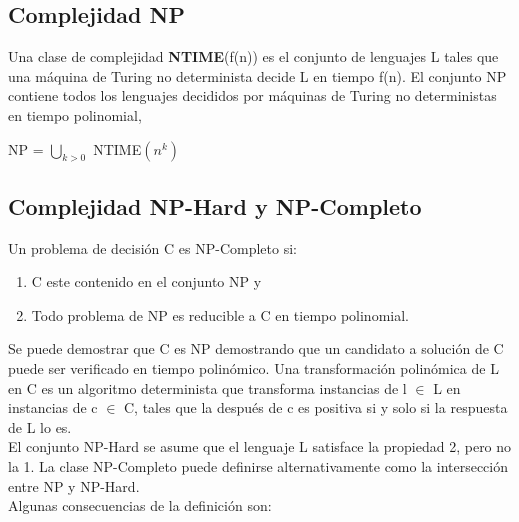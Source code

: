 \documentclass[12pt]{report}
\begin{document}
\subsection{Complejidad NP}
Una clase de complejidad \textbf{NTIME}(f(n)) es el conjunto de lenguajes L tales que una máquina de Turing no determinista decide L en tiempo f(n).
El conjunto NP contiene todos los lenguajes decididos por máquinas de Turing no deterministas en tiempo polinomial,\\%
\begin{center}
NP = $\bigcup_{k>0}$ NTIME$(n^k)$
\end{center}

\subsection{Complejidad NP-Hard y NP-Completo}
Un problema de decisión C es NP-Completo si:
\begin{enumerate}
\item C este contenido en el conjunto NP y
\item Todo problema de NP es reducible a C en tiempo polinomial.
\end{enumerate}
Se puede demostrar que C es NP demostrando que un candidato a solución de C puede ser verificado en tiempo polinómico. Una transformación polinómica de L en C es un algoritmo determinista que transforma instancias de l $\in$ L en instancias de c $\in$ C, tales que la después de c es positiva si y solo si la respuesta de L lo es.\\
El conjunto NP-Hard se asume que el lenguaje L satisface la propiedad 2, pero no la 1. La clase NP-Completo puede definirse alternativamente como la intersección entre NP y NP-Hard.\\
Algunas consecuencias de la definición son:
\end{document}
